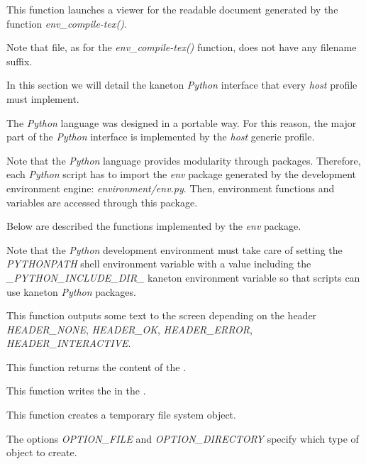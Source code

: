          {
	   This function launches a viewer for the readable document
	   generated by the function \textit{env\_compile-tex()}.

	   \-

	   Note that file, as for the \textit{env\_compile-tex()} function,
	   does not have any filename suffix.
	 }



In this section we will detail the kaneton \textit{Python} interface that
every \textit{host} profile must implement.

The \textit{Python} language was designed in a portable way. For this
reason, the major part of the \textit{Python} interface is implemented
by the \textit{host} generic profile.

Note that the \textit{Python} language provides modularity through packages.
Therefore, each \textit{Python} script has to import the \textit{env} package
generated by the development environment engine: \textit{environment/env.py}.
Then, environment functions and variables are accessed through this package.

Below are described the functions implemented by the \textit{env} package.

Note that the \textit{Python} development environment must take care of
setting the \textit{PYTHONPATH} shell environment variable with a value
including the \textit{\_PYTHON\_INCLUDE\_DIR\_} kaneton environment variable
so that scripts can use kaneton \textit{Python} packages.

         {
	   This function outputs some text to the screen depending on the
	   header \textit{HEADER\_NONE}, \textit{HEADER\_OK},
	   \textit{HEADER\_ERROR}, \textit{HEADER\_INTERACTIVE}.
	 }

         {
	   This function returns the content of the .
	 }

         {
	   This function writes the  in the .
	 }

         {
	   This function creates a temporary file system object.

	   \-

	   The options \textit{OPTION\_FILE} and \textit{OPTION\_DIRECTORY}
	   specify which type of object to create.
	 }

